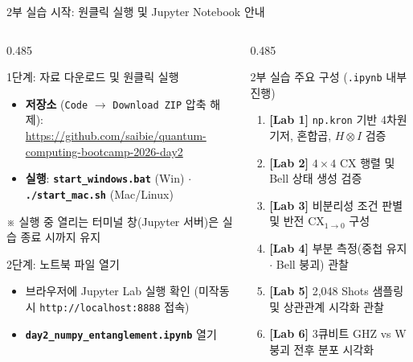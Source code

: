 \documentclass[aspectratio=169, 10pt]{beamer}
\begin{document}
\begin{frame}{2부 실습 시작: 원클릭 실행 및 Jupyter Notebook 안내}
    \begin{columns}[T]
        \begin{column}{0.485\textwidth}
            \begin{qcblock}{1단계: 자료 다운로드 및 원클릭 실행}
                \begin{itemize}
                    \item \textbf{저장소} (\texttt{Code} $\to$ \texttt{Download ZIP} 압축 해제):\\
                    {\scriptsize \url{https://github.com/saibie/quantum-computing-bootcamp-2026-day2}}
                    \item \textbf{실행}: \texttt{\textbf{start\_windows.bat}} (Win) $\cdot$ \texttt{\textbf{./start\_mac.sh}} (Mac/Linux)
                \end{itemize}
                {\scriptsize ※ 실행 중 열리는 터미널 창(Jupyter 서버)은 실습 종료 시까지 유지}
            \end{qcblock}
            \vspace{0.1cm}
            \begin{qctip}{2단계: 노트북 파일 열기}
                \begin{itemize}
                    \item 브라우저에 Jupyter Lab 실행 확인 (미작동 시 \texttt{http://localhost:8888} 접속)
                    \item \texttt{\textbf{day2\_numpy\_entanglement.ipynb}} 열기
                \end{itemize}
            \end{qctip}
        \end{column}
        \begin{column}{0.485\textwidth}
            \begin{qcblock}{2부 실습 주요 구성 (\texttt{.ipynb} 내부 진행)}
                \begin{enumerate}
                    \item \textbf{[Lab 1]} \texttt{np.kron} 기반 4차원 기저, 혼합곱, $H \otimes I$ 검증
                    \item \textbf{[Lab 2]} $4 \times 4$ $\mathrm{CX}$ 행렬 및 Bell 상태 생성 검증
                    \item \textbf{[Lab 3]} 비분리성 조건 판별 및 반전 $\mathrm{CX}_{1\to 0}$ 구성
                    \item \textbf{[Lab 4]} 부분 측정(중첩 유지 $\cdot$ Bell 붕괴) 관찰
                    \item \textbf{[Lab 5]} 2,048 Shots 샘플링 및 상관관계 시각화 관찰
                    \item \textbf{[Lab 6]} 3큐비트 GHZ vs W 붕괴 전후 분포 시각화
                \end{enumerate}
            \end{qcblock}
        \end{column}
    \end{columns}
\end{frame}
\end{document}
